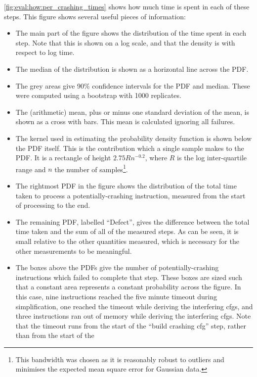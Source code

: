\autoref{fig:eval:how:per_crashing_times} shows how much time is spent
in each of these steps.  This figure shows several useful pieces of
information:
\begin{itemize}
\item The main part of the figure shows the distribution of the time
  spent in each step.  Note that this is shown on a log scale, and
  that the density is with respect to log time.
\item The median of the distribution is shown as a horizontal line
  across the PDF.
\item The grey areas give 90\% confidence intervals for the PDF and
  median.  These were computed using a bootstrap with 1000 replicates.
\item The (arithmetic) mean, plus or minus one standard deviation of
  the mean, is shown as a cross with bars.  This mean is calculated
  ignoring all failures.
\item The kernel used in estimating the probability density function
  is shown below the PDF itself.  This is the contribution which a
  single sample makes to the PDF.  It is a rectangle of height
  $2.75Rn^{-0.2}$, where $R$ is the log inter-quartile range and $n$
  the number of samples\footnote{This bandwidth was chosen as it is
    reasonably robust to outliers and minimises the expected mean
    square error for Gaussian data.}.
\item The rightmost PDF in the figure shows the distribution of the
  total time taken to process a potentially-crashing instruction,
  measured from the start of processing to the end.
\item The remaining PDF, labelled ``Defect'', gives the difference
  between the total time taken and the sum of all of the measured
  steps.  As can be seen, it is small relative to the other quantities
  measured, which is necessary for the other measurements to be
  meaningful.
\item The boxes above the PDFs give the number of potentially-crashing
  instructions which failed to complete that step.  These boxes are
  sized such that a constant area represents a constant probability
  across the figure.  In this case, nine instructions reached the five
  minute timeout during {\StateMachine} simplification, one reached
  the timeout while deriving the interfering \glspl{cfg}, and three
  instructions ran out of memory while deriving the interfering
  \glspl{cfg}.  Note that the timeout runs from the start of the
  ``build crashing \gls{cfg}'' step, rather than from the start of the

\end{itemize}
